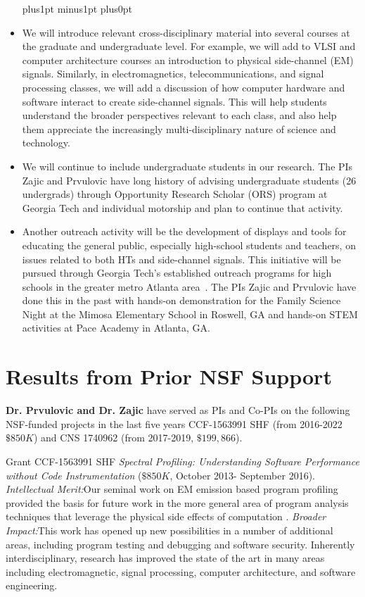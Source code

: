 \documentclass[11 pt]{article}
\def\denseitems{
  \itemsep1pt plus1pt minus1pt
  \parsep0pt plus0pt
  \parskip0pt
  \topsep0pt
}
\begin{document}
\begin{itemize}\denseitems

\item We will introduce relevant cross-disciplinary material into
  several courses at the graduate and undergraduate level. For
  example, we will add to VLSI and computer
  architecture courses an introduction to physical side-channel (EM)
  signals. Similarly, in electromagnetics, telecommunications, and
  signal processing classes, we will add a discussion of how computer
  hardware and software interact to create side-channel signals. This
  will help students understand the broader perspectives relevant to
  each class, and also help them appreciate the increasingly
  multi-disciplinary nature of science and technology.

\item We will continue to include undergraduate students in our
  research. The PIs Zajic and Prvulovic have long history of advising undergraduate students (26 undergrads) through
  Opportunity Research Scholar (ORS) program at Georgia Tech and individual motorship and plan to continue that activity.

\item Another outreach activity will be the development of displays
  and tools for educating the general public, especially high-school
  students and teachers, on issues related to both HTs and side-channel signals. This initiative will be
  pursued through Georgia Tech’s established outreach programs for
  high schools in the greater metro Atlanta area~\cite{Conrad2022}.
  The PIs Zajic and Prvulovic have done this in the past with hands-on demonstration for the Family Science Night at the Mimosa
  Elementary School in Roswell, GA and hands-on STEM activities at Pace Academy in Atlanta, GA.
\end{itemize}


\section{Results from Prior NSF Support}
\label{sec:prior}
\noindent
{\bf Dr. Prvulovic and Dr. Zajic} have served as PIs and Co-PIs on the following NSF-funded projects in the last five years CCF-1563991 SHF (from 2016-2022 $\$850K$) and CNS 1740962 (from 2017-2019, $\$199,866$).

Grant CCF-1563991 SHF \textit{Spectral Profiling: Understanding Software Performance without Code Instrumentation}
($\$850K$, October 2013- September 2016).
\textit{Intellectual Merit:}Our seminal work on EM emission based program profiling provided the basis for
future work in the more general area of program analysis techniques that leverage the physical side
effects of computation \cite{Zop, Zop2, Nader2016, Elvan2021}.
\textit{Broader Impact:}This work has opened up new possibilities in a number of additional areas,
including program testing and debugging and software security. Inherently interdisciplinary, research has improved the state of the art in many areas including electromagnetic, signal processing, computer architecture, and software engineering.
\end{document}
